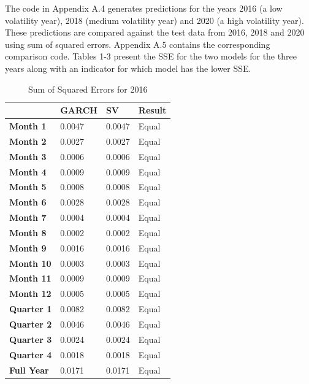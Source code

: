 \documentclass[12pt,letterpaper,reqno,fleqn]{article}
\begin{document}
The code in Appendix A.4 generates predictions for the years 2016 (a low volatility year), 2018 (medium volatility year) and 2020 (a high volatility year). These predictions are compared against the test data from 2016, 2018 and 2020 using sum of squared errors. Appendix A.5 contains the corresponding comparison code. Tables 1-3 present the SSE for the two models for the three years along with an indicator for which model has the lower SSE.

\begin{table}[!ht]
    \centering
    \begin{tabular}{|l|l|l|l|}
    \hline
        ~ & \textbf{GARCH} & \textbf{SV} & \textbf{Result} \\ \hline
        \textbf{Month 1 }& 0.0047 & 0.0047 & Equal \\ \hline
        \textbf{Month 2} & 0.0027 & 0.0027 & Equal \\ \hline
        \textbf{Month 3} & 0.0006 & 0.0006 & Equal \\ \hline
        \textbf{Month 4} & 0.0009 & 0.0009 & Equal \\ \hline
       \textbf{Month 5} & 0.0008 & 0.0008 & Equal \\ \hline
       \textbf{Month 6} & 0.0028 & 0.0028 & Equal \\ \hline
        \textbf{Month 7} & 0.0004 & 0.0004 & Equal \\ \hline
        \textbf{Month 8} & 0.0002 & 0.0002 & Equal \\ \hline
        \textbf{Month 9} & 0.0016 & 0.0016 & Equal \\ \hline
        \textbf{Month 10} & 0.0003 & 0.0003 & Equal \\ \hline
        \textbf{Month 11} & 0.0009 & 0.0009 & Equal \\ \hline
        \textbf{Month 12} & 0.0005 & 0.0005 & Equal \\ \hline
        \textbf{Quarter 1} & 0.0082 & 0.0082 & Equal \\ \hline
        \textbf{Quarter 2} & 0.0046 & 0.0046 & Equal \\ \hline
        \textbf{Quarter 3} & 0.0024 & 0.0024 & Equal \\ \hline
        \textbf{Quarter 4} & 0.0018 & 0.0018 & Equal \\ \hline
        \textbf{Full Year} & 0.0171 & 0.0171 & Equal \\ \hline
    \end{tabular}
\caption{Sum of Squared Errors for 2016}
\end{table}
\end{document}
